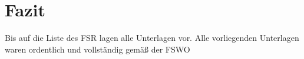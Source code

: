 \documentclass[a4paper]{scrartcl}
\begin{document}













\section{Fazit}

Bis auf die Liste des FSR lagen alle Unterlagen vor. Alle vorliegenden Unterlagen waren ordentlich und vollständig gemäß der FSWO

\end{document}
